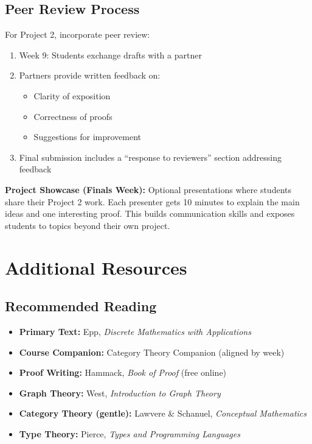 \documentclass[11pt]{article}
\begin{document}
\subsection{Peer Review Process}
For Project 2, incorporate peer review:
\begin{enumerate}
    \item Week 9: Students exchange drafts with a partner
    \item Partners provide written feedback on:
    \begin{itemize}
        \item Clarity of exposition
        \item Correctness of proofs
        \item Suggestions for improvement
    \end{itemize}
    \item Final submission includes a ``response to reviewers'' section addressing feedback
\end{enumerate}

\begin{activitybox}
\textbf{Project Showcase (Finals Week):}
Optional presentations where students share their Project 2 work. Each presenter gets 10 minutes to explain the main ideas and one interesting proof. This builds communication skills and exposes students to topics beyond their own project.
\end{activitybox}

\newpage
\section{Additional Resources}

\subsection{Recommended Reading}
\begin{itemize}
    \item \textbf{Primary Text:} Epp, \textit{Discrete Mathematics with Applications}
    \item \textbf{Course Companion:} Category Theory Companion (aligned by week)
    \item \textbf{Proof Writing:} Hammack, \textit{Book of Proof} (free online)
    \item \textbf{Graph Theory:} West, \textit{Introduction to Graph Theory}
    \item \textbf{Category Theory (gentle):} Lawvere \& Schanuel, \textit{Conceptual Mathematics}
    \item \textbf{Type Theory:} Pierce, \textit{Types and Programming Languages}
\end{itemize}
\end{document}

